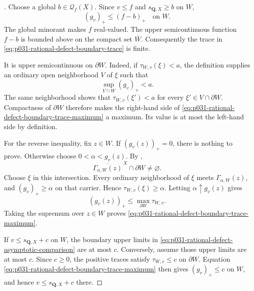
\begin{proof}[]
Choose a global $b\in\mathcal Q_f(X)$.  Since $v\leq f$ and
$s_{\mathbf Q,X}\geq b$ on $W$,
\[
                    (g_v)_+\leq(f-b)_+\quad\text{on }W.
\]
The global minorant makes $f$ real-valued.  The upper semicontinuous
function $f-b$ is bounded above on the compact set $\overline W$.
Consequently the trace in
\eqref{eq:p031-rational-defect-boundary-trace} is finite.

It is upper semicontinuous on $\partial W$.  Indeed, if
$\tau_{W,v}(\xi)<a$, the definition supplies an ordinary open
neighborhood $V$ of $\xi$ such that
\[
                     \sup_{V\cap W}(g_v)_+<a.
\]
The same neighborhood shows that
$\tau_{W,v}(\xi')<a$ for every
$\xi'\in V\cap\partial W$.  Compactness of $\partial W$ therefore makes
the right-hand side of
\eqref{eq:p031-rational-defect-boundary-trace-maximum} a maximum.  Its
value is at most the left-hand side by definition.

For the reverse inequality, fix $z\in W$.  If $(g_v(z))_+=0$, there is
nothing to prove.  Otherwise choose $0<\alpha<g_v(z)$.  By
,
\[
      \overline{\Gamma_{\alpha,W}(z)}^{\,X}
                      \cap\partial W\ne\varnothing.
\]
Choose $\xi$ in this intersection.  Every ordinary neighborhood of $\xi$
meets $\Gamma_{\alpha,W}(z)$, and $(g_v)_+\geq\alpha$ on that carrier.
Hence $\tau_{W,v}(\xi)\geq\alpha$.  Letting
$\alpha\uparrow g_v(z)$ gives
\[
             (g_v(z))_+
                  \leq\max_{\partial W}\tau_{W,v}.
\]
Taking the supremum over $z\in W$ proves
\eqref{eq:p031-rational-defect-boundary-trace-maximum}.

If $v\leq s_{\mathbf Q,X}+c$ on $W$, the boundary upper limits in
\eqref{eq:p031-rational-defect-asymptotic-comparison} are at most $c$.
Conversely, assume those upper limits are at most $c$.  Since $c\geq0$,
the positive traces satisfy $\tau_{W,v}\leq c$ on $\partial W$.
Equation \eqref{eq:p031-rational-defect-boundary-trace-maximum} then gives
$(g_v)_+\leq c$ on $W$, and hence $v\leq s_{\mathbf Q,X}+c$ there.
\end{proof}

